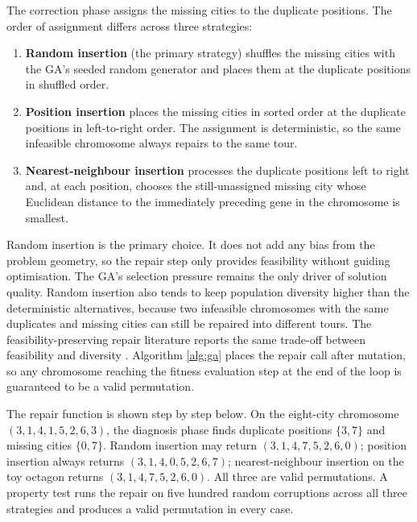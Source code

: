 The correction phase assigns the missing cities to the duplicate
positions. The order of assignment differs across three strategies:
\begin{enumerate}[nosep]
    \item \textbf{Random insertion} (the primary strategy) shuffles the
          missing cities with the GA's seeded random generator and
          places them at the duplicate positions in shuffled order.
    \item \textbf{Position insertion} places the missing cities in
          sorted order at the duplicate positions in left-to-right
          order. The assignment is deterministic, so the same
          infeasible chromosome always repairs to the same tour.
    \item \textbf{Nearest-neighbour insertion} processes the duplicate
          positions left to right and, at each position, chooses the
          still-unassigned missing city whose Euclidean distance to the
          immediately preceding gene in the chromosome is smallest.
\end{enumerate}
Random insertion is the primary choice. It does not add any bias from the
problem geometry, so the repair step only provides feasibility without
guiding optimisation. The GA's selection pressure remains the only
driver of solution quality. Random insertion also tends to keep
population diversity higher than the deterministic alternatives,
because two infeasible chromosomes with the same duplicates and missing
cities can still be repaired into different tours. The
feasibility-preserving repair literature reports the same trade-off
between feasibility and diversity
\cite{padhye2015feasibilitypreserving}. Algorithm \ref{alg:ga} places
the repair call after mutation, so any chromosome reaching the fitness
evaluation step at the end of the loop is guaranteed to be a valid
permutation.

The repair function is shown step by step below. On the eight-city
chromosome $(3,1,4,1,5,2,6,3)$, the diagnosis phase finds duplicate
positions $\{3, 7\}$ and missing cities $\{0, 7\}$. Random insertion may
return $(3,1,4,7,5,2,6,0)$; position insertion always returns
$(3,1,4,0,5,2,6,7)$; nearest-neighbour insertion on the toy octagon
returns $(3,1,4,7,5,2,6,0)$. All three are valid permutations. A
property test runs the repair on five hundred random corruptions across
all three strategies and produces a valid permutation in every case.

